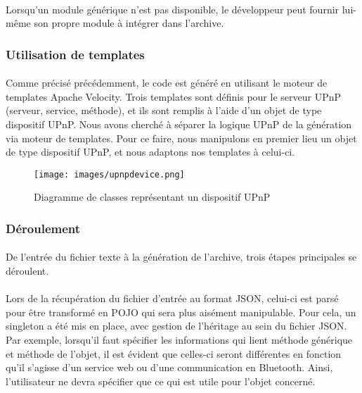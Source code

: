 \documentclass[nocopyrightspace]{sigplanconf}
\begin{document}
			\paragraph{}
			Lorsqu’un module générique n’est pas disponible, le développeur peut fournir lui-même son propre module à intégrer dans l’archive.

		\subsubsection{Utilisation de templates}

			\paragraph{}
			Comme précisé précédemment, le code est généré en utilisant le moteur de templates Apache Velocity. Trois templates sont définis pour le serveur UPnP (serveur, service, méthode), et ils sont remplis à l’aide d’un objet de type dispositif UPnP. Nous avons cherché à séparer la logique UPnP de la génération via moteur de templates. Pour ce faire, nous manipulons en premier lieu un objet de type dispositif UPnP, et nous adaptons nos templates à celui-ci.

			\begin{figure}[h]
				\centering
				\texttt{[image: images/upnpdevice.png]}
				\caption{Diagramme de classes représentant un dispositif UPnP}
			\end{figure}

		\subsubsection{Déroulement}

			\paragraph{}
			De l’entrée du fichier texte à la génération de l’archive, trois étapes principales se déroulent.

			\paragraph{}
			Lors de la récupération du fichier d'entrée au format JSON, celui-ci est parsé pour être transformé en POJO qui sera plus aisément manipulable. Pour cela, un singleton a été mis en place, avec gestion de l'héritage au sein du fichier JSON. Par exemple, lorsqu'il faut spécifier les informations qui lient méthode générique et méthode de l'objet, il est évident que celles-ci seront différentes en fonction qu'il s'agisse d'un service web ou d'une communication en Bluetooth. Ainsi, l'utilisateur ne devra spécifier que ce qui est utile pour l'objet concerné.
\end{document}

